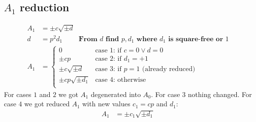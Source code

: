 \documentclass{article}
\begin{document}
\subsection{$A_1$ reduction}
\begin{align}
A_1 &= \pm c\sqrt{\pm d}\\
d   &= p^2d_1 \qquad \textbf{ From $d$ find $p,d_1$ where $d_1$ is square-free or $1$} \\
A_1 &= \begin{cases}
 0                    &\text{case 1: if } c = 0 \lor d = 0\\
 \pm cp               &\text{case 2: if } d_1 = +1\\
 \pm c\sqrt{\pm d}    &\text{case 3: if } p = 1 \text{ (already reduced)}\\
 \pm cp\sqrt{\pm d_1} &\text{case 4: otherwise }\\
\end{cases}
\end{align}
For cases $1$ and $2$ we got $A_1$ degenerated into $A_0$.
For case $3$ nothing changed.
For case $4$ we got reduced $A_1$ with new values $c_1=cp$ and $d_1$:
\begin{align}
A_1 &= \pm c_1\sqrt{\pm d_1}
\end{align}
\end{document}
